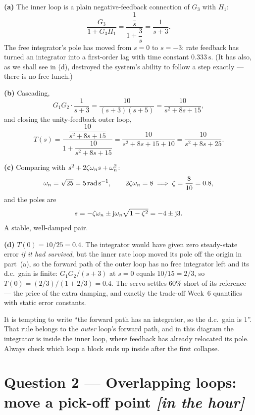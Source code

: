 \documentclass[11pt,a4paper]{article}
\newcommand{\inhour}{\hfill{\small\color{faccent}\itshape[in the hour]}}
\begin{document}
\begin{solution}
\textbf{(a)} The inner loop is a plain negative-feedback connection of $G_3$
with $H_1$:
\[
  \frac{G_3}{1+G_3H_1}=\frac{\dfrac{1}{s}}{1+\dfrac{3}{s}}=\frac{1}{s+3}.
\]
The free integrator's pole has moved from $s=0$ to $s=-3$: rate feedback has
turned an integrator into a first-order lag with time constant
$\SI{0.333}{\second}$. (It has also, as we shall see in (d), destroyed the
system's ability to follow a step exactly --- there is no free lunch.)

\medskip
\textbf{(b)} Cascading,
\[
  G_1G_2\cdot\frac{1}{s+3}=\frac{10}{(s+3)(s+5)}=\frac{10}{s^{2}+8s+15},
\]
and closing the unity-feedback outer loop,
\[
  T(s)=\frac{\dfrac{10}{s^{2}+8s+15}}{1+\dfrac{10}{s^{2}+8s+15}}
   =\frac{10}{s^{2}+8s+15+10}
   =\frac{10}{s^{2}+8s+25}.
\]

\medskip
\textbf{(c)} Comparing with $s^{2}+2\zeta\omega_{n} s+\omega_{n}^{2}$:
\[
  \omega_{n}=\sqrt{25}=\SI{5}{\radian\per\second},
  \qquad
  2\zeta\omega_{n}=8\;\Longrightarrow\;\zeta=\frac{8}{10}=0.8,
\]
and the poles are
\[
  s=-\zeta\omega_{n}\pm\mathrm{j}\omega_{n}\sqrt{1-\zeta^{2}}=-4\pm\mathrm{j}3 .
\]
A stable, well-damped pair.

\medskip
\textbf{(d)} $T(0)=10/25=0.4$. The integrator would have given zero
steady-state error \emph{if it had survived}, but the inner rate loop moved its
pole off the origin in part~(a), so the forward path of the outer loop has no
free integrator left and its d.c.\ gain is finite:
$G_1G_2/(s+3)$ at $s=0$ equals $10/15=2/3$, so
$T(0)=(2/3)/(1+2/3)=0.4$. The servo settles $60\%$ short of its reference ---
the price of the extra damping, and exactly the trade-off Week~6 quantifies
with static error constants.
\end{solution}

\begin{pitfall}
It is tempting to write ``the forward path has an integrator, so the d.c.\ gain
is $1$''. That rule belongs to the \emph{outer} loop's forward path, and in
this diagram the integrator is inside the inner loop, where feedback has
already relocated its pole. Always check which loop a block ends up inside
after the first collapse.
\end{pitfall}

\section*{Question 2 --- Overlapping loops: move a pick-off point \inhour}
\end{document}
